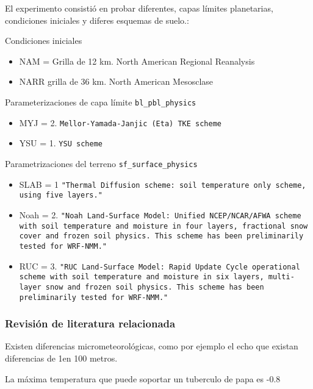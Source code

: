 El experimento consistió en probar diferentes, capas límites planetarias, condiciones iniciales y diferes esquemas de suelo.:

Condiciones iniciales
\begin{itemize}
\item NAM = Grilla de 12 km. North American Regional Reanalysis
\item NARR grilla de 36 km. North American Mesosclase
\end{itemize}

Parameterizaciones de capa límite \texttt{bl\_pbl\_physics}
\begin{itemize}
\item MYJ = 2. \texttt{Mellor-Yamada-Janjic (Eta) TKE scheme}
\item YSU = 1. \texttt{YSU scheme}
\end{itemize}

Parametrizaciones del terreno \texttt{sf\_surface\_physics}
\begin{itemize}

\item SLAB = 1 \texttt{"Thermal Diffusion scheme: soil temperature only scheme, using five layers."}

\item Noah = 2. \texttt{"Noah Land-Surface Model: Unified NCEP/NCAR/AFWA scheme with soil temperature and moisture in four layers, fractional snow cover and frozen soil physics. This scheme has been preliminarily tested for WRF-NMM."}


\item RUC = 3. \texttt{"RUC Land-Surface Model: Rapid Update Cycle operational scheme with soil temperature and moisture in six layers, multi-layer snow and frozen soil physics. This scheme has been preliminarily tested for WRF-NMM."}



\end{itemize}



\subsubsection{Revisión de literatura relacionada}


Existen diferencias micrometeorológicas, como por ejemplo el echo que existan diferencias de 1\celc en 100 metros.

La máxima temperatura que puede soportar un tuberculo de papa es -0.8\celc\\


